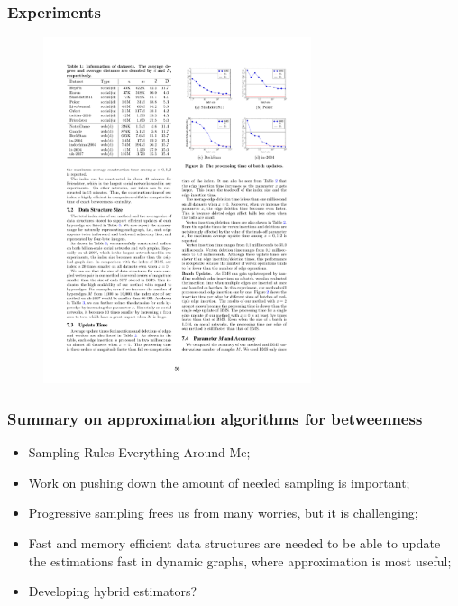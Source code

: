 \begin{frame}
  \frametitle{Experiments}
  \begin{figure}
    \includegraphics[width=0.7\textwidth]{imgs/Ayashi-expers.pdf}
  \end{figure}
\end{frame}

\begin{frame}
  \frametitle{Summary on approximation algorithms for betweenness}
  \begin{itemize}
    \item Sampling Rules Everything Around Me;
      \pause
    \item Work on pushing down the amount of needed sampling is important;
      \pause
    \item Progressive sampling frees us from many worries, but it is
      challenging;
      \pause
    \item  Fast and memory efficient data structures are needed to be able to
      update the estimations fast in dynamic graphs, where approximation is
      most useful;
      \pause
    \item Developing hybrid estimators?
  \end{itemize}
\end{frame}

